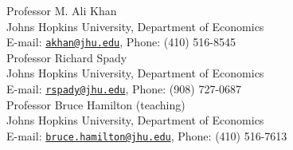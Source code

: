 \documentclass[11pt]{res}
\begin{document}
\begin{resume}
\vspace{-5 mm} Professor M. Ali Khan\\
Johns Hopkins University, Department of Economics\\
E-mail: \href{mailto:akhan@jhu.edu}{\texttt{akhan@jhu.edu}}, Phone: (410) 516-8545\\

\vspace{-5 mm} Professor Richard Spady  \\
Johns Hopkins University, Department of Economics\\
E-mail: \href{mailto:rspady@jhu.edu}{\texttt{rspady@jhu.edu}}, Phone: (908) 727-0687\\

\vspace{-5 mm} Professor Bruce Hamilton (teaching)  \\
Johns Hopkins University, Department of Economics\\
E-mail: \href{mailto:bruce.hamilton@jhu.edu}{\texttt{bruce.hamilton@jhu.edu}}, Phone: (410) 516-7613\\






\end{resume}
\end{document}
